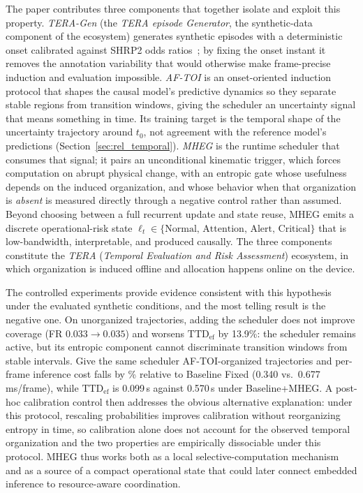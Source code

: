 \documentclass[a4paper,fleqn]{cas-dc}
\begin{document}
The paper contributes three components that together isolate and exploit this
property. \textit{TERA-Gen} {\color{\revcolor}(the \emph{TERA episode Generator}, the synthetic-data component of the ecosystem)} generates synthetic episodes with a deterministic
onset calibrated against SHRP2 odds ratios~\cite{dingus2016shrp2}; by fixing the
onset instant it removes the annotation variability that would otherwise make
frame-precise induction and evaluation impossible. \textit{AF-TOI} is an
onset-oriented induction protocol that shapes the causal model's predictive
dynamics so they separate stable regions from transition windows, giving the
scheduler an uncertainty signal that means something in time.
{\color{\revcolor}Its training target is the temporal shape of the uncertainty
trajectory around $t_0$, not agreement with the reference model's
predictions (Section~\ref{sec:rel_temporal}).} \textit{MHEG} is
the runtime scheduler that consumes that signal; it pairs an unconditional
kinematic trigger, which forces computation on abrupt physical change, with an
entropic gate whose usefulness depends on the induced organization, and whose
behavior when that organization is \emph{absent} is measured directly through a
negative control rather than assumed. Beyond choosing between a full recurrent
update and state reuse, \mbox{MHEG} emits a discrete operational-risk state
$\ell_t \in \{\text{Normal},\, \text{Attention},\, \text{Alert},\, \text{Critical}\}$
that is low-bandwidth, interpretable, and produced causally. The three components
constitute the \textit{TERA} (\textit{Temporal Evaluation and Risk Assessment})
ecosystem, in which organization is induced offline and allocation happens online
on the device.

The controlled experiments provide evidence consistent with this hypothesis
under the evaluated synthetic conditions, and the most telling result is the
negative one. On unorganized trajectories, adding the scheduler does not
improve coverage (FR $0.033 \rightarrow 0.035$) and worsens $\mathrm{TTD}_{\mathrm{ef}}$ by
{\color{\revcolor}13.9\%}: the scheduler
{\color{\revcolor}remains active, but its entropic component cannot
discriminate transition windows from stable intervals.}
{\color{\revcolor}Give the same scheduler \mbox{AF-TOI}-organized trajectories
and per-frame inference cost falls by \CostReduction\% relative to Baseline
Fixed (0.340 vs.\ 0.677\,ms/frame), while $\mathrm{TTD}_{\mathrm{ef}}$ is
0.099\,s against 0.570\,s under Baseline+MHEG}.
A post-hoc calibration control then addresses the obvious alternative
explanation: under this protocol, rescaling probabilities improves calibration
without reorganizing entropy in time, so calibration alone does not account
for the observed temporal organization and the two properties are empirically
dissociable under this protocol. \mbox{MHEG} thus works both as a
local selective-computation mechanism and as a source of a compact operational
state that could later connect embedded inference to resource-aware coordination.
\end{document}
